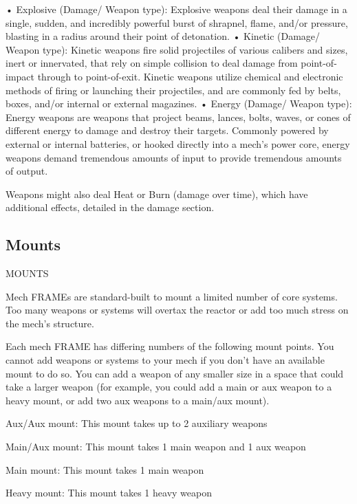 •  Explosive (Damage/ Weapon type): Explosive weapons deal their damage in a single,  
  sudden, and incredibly powerful burst of shrapnel, flame, and/or pressure, blasting in a radius  
  around their point of detonation.   
•  Kinetic (Damage/ Weapon type): Kinetic weapons fire solid projectiles of various calibers and  
  sizes, inert or innervated, that rely on simple collision to deal damage from point-of-impact  
  through to point-of-exit. Kinetic weapons utilize chemical and electronic methods of firing or  
  launching their projectiles, and are commonly fed by belts, boxes, and/or internal or external  
  magazines.   
•  Energy (Damage/ Weapon type): Energy weapons are weapons that project beams, lances,  
  bolts, waves, or cones of different energy to damage and destroy their targets. Commonly  
  powered by external or internal batteries, or hooked directly into a mech’s power core, energy  
  weapons demand tremendous amounts of input to provide tremendous amounts of output. 
 

Weapons might also deal Heat or Burn (damage over time), which have additional effects,  
detailed in the damage section.  
\subsection{Mounts}
                                                 MOUNTS  

Mech FRAMEs are standard-built to mount a limited number of core systems. Too many  
weapons or systems will overtax the reactor or add too much stress on the mech’s structure.
 

Each mech FRAME has differing numbers of the following mount points. You cannot add  
weapons or systems to your mech if you don’t have an available mount to do so. You can add a  
weapon of any smaller size in a space that could take a larger weapon (for example, you could  
add a main or aux weapon to a heavy mount, or add two aux weapons to a main/aux mount).
 

Aux/Aux mount: This mount takes up to 2 auxiliary weapons
 
Main/Aux mount: This mount takes 1 main weapon and 1 aux weapon
 
Main mount: This mount takes 1 main weapon
 
Heavy mount:  This mount takes 1 heavy weapon
 

                                                                                                              


